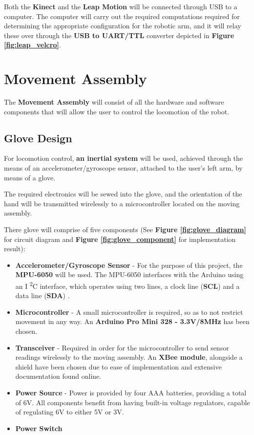 \documentclass[12p,a4paper]{report}
\begin{document}
Both the \textbf{Kinect} and the \textbf{Leap Motion} will be connected through USB to a computer. The computer will carry out the required computations required for determining the appropriate configuration for the robotic arm, and it will relay these over through the \textbf{USB to UART/TTL} converter depicted in \textbf{Figure \ref{fig:leap_velcro}}.

\newpage
\section{Movement Assembly}

The \textbf{Movement Assembly} will consist of all the hardware and software components that will allow the user to control the locomotion of the robot.  
\subsection{Glove Design}
For locomotion control, \textbf{an inertial system} will be used, achieved through the means of an accelerometer/gyroscope sensor, attached to the user's left arm, by means of a glove.

The required electronics will be sewed into the glove, and the orientation of the hand will be transmitted wirelessly to a microcontroller located on the moving assembly.

There glove will comprise of five components (See \textbf{Figure \ref{fig:glove_diagram}} for circuit diagram and \textbf{Figure \ref{fig:glove_component}} for implementation result):

\begin{itemize}
\item \textbf{Accelerometer/Gyroscope Sensor} - For the purpose of this project, the \textbf{MPU-6050} will be used. The MPU-6050 interfaces with the Arduino using an I \textsuperscript{2}C interface, which operates using two lines, a clock line (\textbf{SCL}) and a data line (\textbf{SDA}) \cite{i2c}. 
\item \textbf{Microcontroller} - A small microcontroller is required, so as to not restrict movement in any way. An \textbf{Arduino Pro Mini 328 - 3.3V/8MHz} has been chosen.
\item \textbf{Transceiver} - Required in order for the microcontroller to send sensor readings wirelessly to the moving assembly. An \textbf{XBee module}, alongside a shield have been chosen due to ease of implementation and extensive documentation found online.
\item \textbf{Power Source} - Power is provided by four AAA batteries, providing a total of 6V. All components benefit from having built-in voltage regulators, capable of regulating 6V to either 5V or 3V.
\item \textbf{Power Switch}
\end{itemize}
\end{document}

